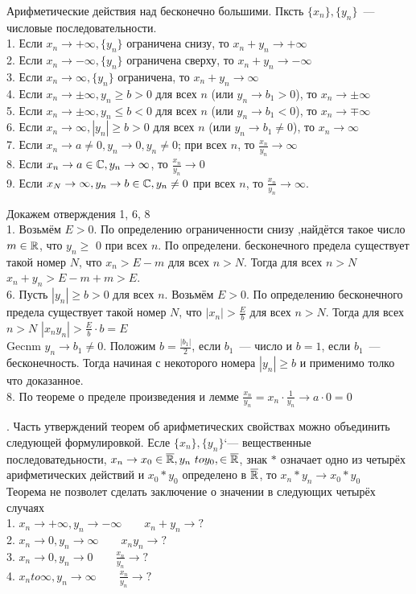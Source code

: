 \T \q Арифметические действия над бесконечно большими. Пксть $\{x_n\}, \{y_n\}$~--- числовые последовательности.\\
1. Если $x_n \to +\infty, \{y_n\}$ ограничена снизу, то $x_n + y_n\to +\infty$\\
2. Если $x_n\to -\infty, \{y_n\}$ ограничена сверху, то $x_n + y_n \to -\infty$\\
3. Если $x_n \to \infty, \{y_n\}$ ограничена, то $x_n + y_n \to \infty$\\
4. Если $x_n \to \pm\infty, y_n \ge b > 0$ для всех $n$ (или $y_n \to b_1 > 0$), то $x_n \to \pm\infty$\\
5. Если $x_n \to \pm\infty, y_n \le b < 0$ для всех $n$ (или $y_n \to b_1 < 0$), то $x_n \to \mp\infty$\\
6. Если $x_n \to \infty, |y_n| \ge b > 0$ для всех $n$ (или $y_n \to b_1 \neq 0$), то $x_n \to \infty$\\
7. Если $x_n \to a\neq 0, y_n \to 0, y_n\neq 0$; при всех $n$, то $\frac{x_n}{y_n} \to \infty$\\
8. Если $x_n\to  a \in \mathbb{C}, y_n\to\infty$, то $\frac{x_n}{y_n} \to 0$\\
9. Если $x_N \to \infty, y_n \to b \in \mathbb{C}, y_n\neq 0$ при всех $n$, то $\frac{x_n}{y_n} \to \infty$.

\D Докажем отверждения 1, 6, 8\\
1. Возьмём $E > 0$. По определению ограниченности снизу ,найдётся такое число $m \in \mathbb{R}$, что $y_n \ge$ 0 при всех $n$. По определени. бесконечного предела существует такой номер $N$, что $x_n > E - m$ для всех $n > N$. Тогда для всех $n > N$ $x_n + y_n > E - m + m > E$.\\
6. Пусть $|y_n| \ge b > 0$ для всех $n$. Возьмём $E > 0$. По определению бесконечного предела существует такой номер $N$, что $|x_n| > \frac{E}{b}$ для всех $n > N$. Тогда для всех $n > N$ $|x _n y_n| > \frac{E}{b} \cdot b = E$\\
Gecnm $y_n \to b_1 \neq 0$. Положим $b = \frac{|b_1|}{2}$, если $b_1$~--- число и $b = 1$, если $b_1$~--- бесконечность. Тогда начиная с некоторого номера $|y_n| \ge b$ и применимо толко что доказанное.\\
8. По теореме о пределе произведения и лемме $\frac{x_n}{y_n} = x_n \cdot\frac{1}{y_n}\to a\cdot 0 = 0$

. Часть утверждений теорем об арифметических свойствах можно объединить следующей формулировкой. Есле $\{x_n\}, \{y_n\}$`--- вещественные последоватедьности, $x_n \to x_0 \in \overline{\mathbb{R}}, y_n\ to y_0, \in \overline{\mathbb{R}}$, знак $*$ означает одно из четырёх арифметических действий и $x_0*y_0$ определено в $\overline{\mathbb{R}}$, то $x_n*y_n \to x_0*y_0$ \\
Теорема не позволет сделать заключение о значении в следующих четырёх случаях\\
1. $x_n \to +\infty, y_n \to -\infty\qquad x_n + y_n \to ?$\\
2. $x_n \to 0, y_n \to \infty\qquad x_n y_n \to ?$\\
3. $x_n \to 0, y_n \to 0 \qquad \frac{x_n}{y_n} \to ?$\\
4. $x_nto \infty, y_n \to \infty\qquad \frac{x_n}{y_n}\to ?$